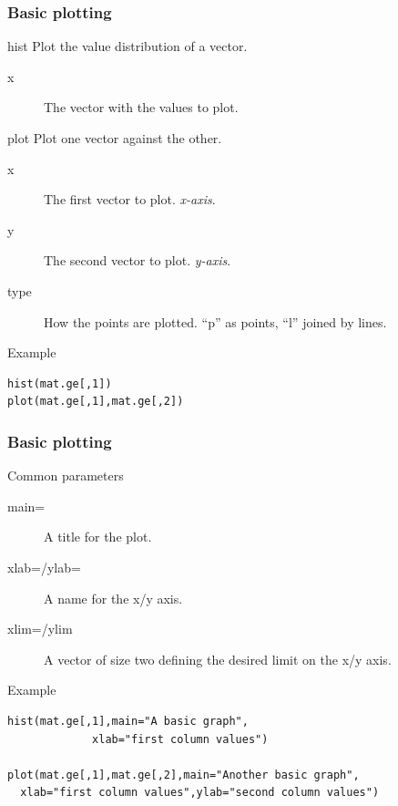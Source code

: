 \documentclass[10pt]{beamer}
\newenvironment{xframe}[2][]
  {\begin{frame}[fragile,environment=xframe,#1]
  \frametitle{#2}}
  {\end{frame}}
\begin{document}
\begin{xframe}{Basic plotting}
  \begin{block}{{\sf hist}}
    Plot the value distribution of a vector.
    \begin{description}
    \item[x] The vector with the values to plot.
    \end{description}
  \end{block}
  \begin{block}{{\sf plot}}
    Plot one vector against the other.
    \begin{description}
      \item[x] The first vector to plot. {\it x-axis}. 
      \item[y] The second vector to plot. {\it y-axis}. 
      \item[type] How the points are plotted. ``p'' as points, ``l'' joined by lines.
    \end{description}
  \end{block}
  \begin{exampleblock}{Example}
\begin{verbatim}
hist(mat.ge[,1])
plot(mat.ge[,1],mat.ge[,2])
\end{verbatim}  
  \end{exampleblock}
\end{xframe}


\begin{xframe}{Basic plotting}
  \begin{block}{Common parameters}
    \begin{description}
    \item[main=] A title for the plot.
    \item[xlab=/ylab=] A name for the x/y axis.
    \item[xlim=/ylim] A vector of size two defining the desired limit on the x/y axis.
    \end{description}
  \end{block}
  \begin{exampleblock}{Example}
\begin{verbatim}
hist(mat.ge[,1],main="A basic graph",
             xlab="first column values")

plot(mat.ge[,1],mat.ge[,2],main="Another basic graph",
  xlab="first column values",ylab="second column values")
\end{verbatim}  
  \end{exampleblock}
\end{xframe}
\end{document}

